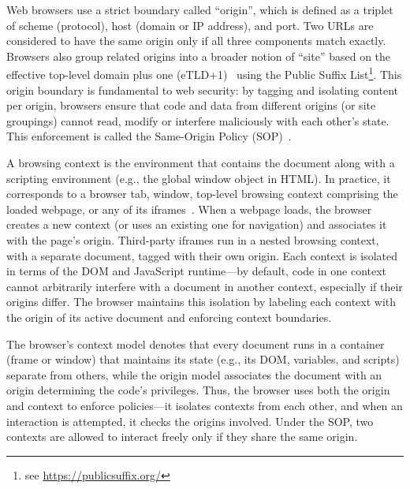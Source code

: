 %
Web browsers use a strict boundary called ``origin'', which is defined as a triplet of scheme (protocol), host (domain or IP address), and port. 
%
Two URLs are considered to have the same origin only if all three components match exactly. 
%
Browsers also group related origins into a broader notion of ``site'' based on the effective top-level domain plus one (eTLD+1)~\cite{TrackingPreventionWebKit2020} using the Public Suffix List\footnote{see \url{https://publicsuffix.org/}}.
%
This origin boundary is fundamental to web security: by tagging and isolating content per origin, browsers ensure that code and data from different origins (or site groupings) cannot read, modify or interfere maliciously with each other's state.
%
This enforcement is called the Same-Origin Policy (SOP)~\cite{mdnSameoriginPolicySecurity2024}.
%
%


%
A browsing context is the environment that contains the document along with a scripting environment (e.g., the global window object in HTML). 
%
In practice, it corresponds to a browser tab, window, top-level browsing context comprising the loaded webpage, or any of its iframes~\cite{MDNBrowsingContext}. 
%
When a webpage loads, the browser creates a new context (or uses an existing one for navigation) and associates it with the page’s origin. 
%
Third-party iframes run in a nested browsing context, with a separate document, tagged with their own origin.
%
Each context is isolated in terms of the DOM and JavaScript runtime---by default, code in one context cannot arbitrarily interfere with a document in another context, especially if their origins differ.
%
The browser maintains this isolation by labeling each context with the origin of its active document and enforcing context boundaries. 



%
The browser's context model denotes that every document runs in a container (frame or window) that maintains its state (e.g., its DOM, variables, and scripts) separate from others, while the origin model associates the document with an origin determining the code’s privileges.
%
Thus, the browser uses both the origin and context to enforce policies---it isolates contexts from each other, and when an interaction is attempted, it checks the origins involved. 
%
Under the SOP, two contexts are allowed to interact freely only if they share the same origin.
%




